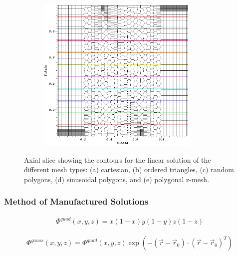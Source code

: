 \begin{figure}
	\hfill
	\begin{subfigure}[b]{0.45\textwidth}
		\centering
		\includegraphics[width=0.85\textwidth]{figures/sec_DSA/SIP_z_poly_lin_contour.png}
		\caption{}
	\end{subfigure}
\caption{Axial slice showing the contours for the linear solution of the different mesh types: (a) cartesian, (b) ordered triangles, (c) random polygons, (d) sinusoidal polygons, and (e) polygonal z-mesh.}
\label{fig::SIP_mesh_slices}
\end{figure}

\subsubsection{Method of Manufactured Solutions}
\label{sec::DSA_Results_SIP_MMS}

\begin{equation}
\label{eq::SIP_quad_mms_solution}
\begin{aligned}
\Phi^{quad} (x,y,z) = x(1-x)y(1-y)z(1-z) 
\end{aligned}
\end{equation}

\begin{equation}
\label{eq::SIP_gauss_mms_solution}
\begin{aligned}
\Phi^{gauss} (x,y,z) = \Phi^{quad} (x,y,z) \exp(- (\vec{r} - \vec{r}_0) \cdot (\vec{r} - \vec{r}_0)^{T}  )
\end{aligned}
\end{equation}


